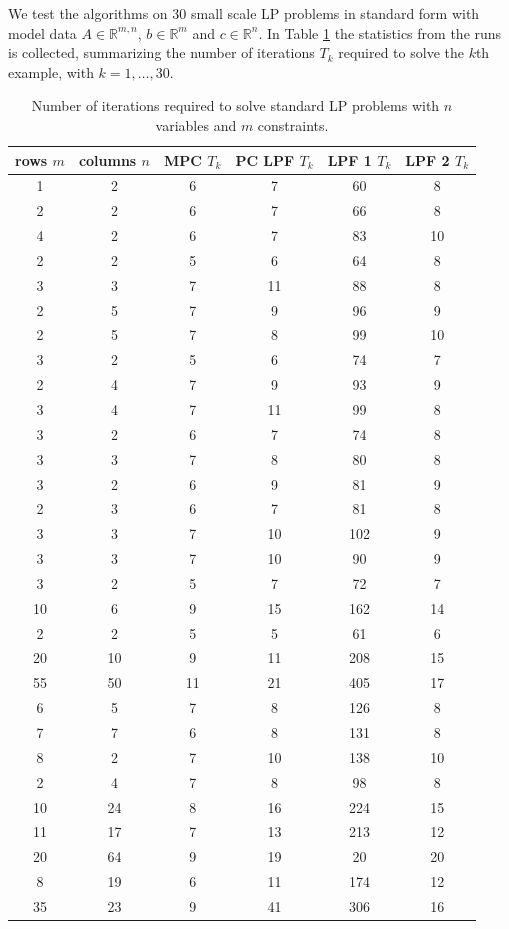 \documentclass[a4paper,10 pt,titlepage,twoside]{book}
\theoremstyle{plain}
\theoremstyle{definition}
\theoremstyle{remark}
\begin{document}
We test the algorithms on 30 small scale LP problems in standard form with model data $A\in\mathbb{R}^{m,n}$, $b\in\mathbb{R}^{m}$ and $c\in\mathbb{R}^{n}$. In Table \ref{tab:numite} the statistics from the runs is collected, summarizing the number of iterations $T_{k}$ required to solve the $k$th example, with $k =1,\dots,30$.
\begin{table}[h]\caption{\label{tab:numite}Number of iterations required to solve standard LP problems with $n$ variables and $m$ constraints.}
	\begin{center}
	\begin{tabular}{cccccc}
		\hline
		\textbf{rows $m$} & \textbf{columns $n$} & \textbf{MPC $T_{k}$} & \textbf{PC LPF $T_{k}$} & \textbf{LPF 1 $T_{k}$} & \textbf{LPF 2 $T_{k}$} \\ \hline
		1 & 2 & 6 & 7 & 60 & 8 \\
		2 & 2 & 6 & 7 & 66 & 8 \\
		4 & 2 & 6 & 7 & 83 & 10 \\
		2 & 2 & 5 & 6 & 64 & 8 \\
		3 & 3 & 7 & 11 & 88 & 8 \\
		2 & 5 & 7 & 9 & 96 & 9 \\
		2 & 5 & 7 & 8 & 99 & 10 \\
		3 & 2 & 5 & 6 & 74 & 7 \\
		2 & 4 & 7 & 9 & 93 & 9 \\
		3 & 4 & 7 & 11 & 99 & 8 \\
		3 & 2 & 6 & 7 & 74 & 8 \\
		3 & 3 & 7 & 8 & 80 & 8 \\
		3 & 2 & 6 & 9 & 81 & 9 \\
		2 & 3 & 6 & 7 & 81 & 8 \\
		3 & 3 & 7 & 10 & 102 & 9 \\
		3 & 3 & 7 & 10 & 90 & 9 \\
		3 & 2 & 5 & 7 & 72 & 7 \\
		10 & 6 & 9 & 15 & 162 & 14 \\
		2 & 2 & 5 & 5 & 61 & 6 \\
		20 & 10 & 9 & 11 & 208 & 15 \\
		55 & 50 & 11 & 21 & 405 & 17 \\
		6 & 5 & 7 & 8 & 126 & 8 \\
		7 & 7 & 6 & 8 & 131 & 8 \\
		8 & 2 & 7 & 10 & 138 & 10 \\
		2 & 4 & 7 & 8 & 98 & 8 \\
		10 & 24 & 8 & 16 & 224 & 15 \\
		11 & 17 & 7 & 13 & 213 & 12 \\
		20 & 64 & 9 & 19 & 20 & 20 \\
		8 & 19 & 6 & 11 & 174 & 12 \\
		35 & 23 & 9 & 41 & 306 & 16 \\ \hline
	\end{tabular}
\end{center}
\end{table}
\end{document}
